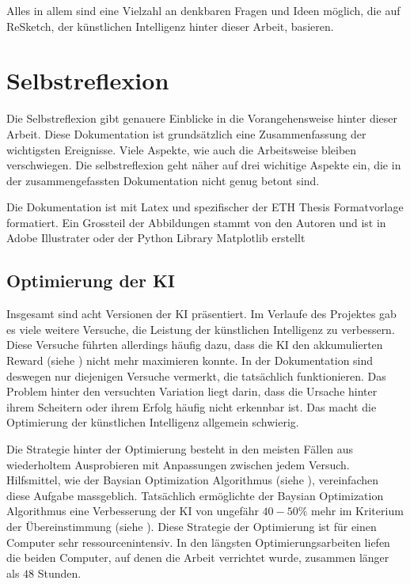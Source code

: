 Alles in allem sind eine Vielzahl an denkbaren Fragen und Ideen möglich, die auf
ReSketch, der künstlichen Intelligenz hinter dieser Arbeit, basieren.


\section{Selbstreflexion}\label{chap:d_reflex} Die Selbstreflexion gibt genauere
Einblicke in die Vorangehensweise hinter dieser Arbeit. Diese Dokumentation ist
grundsätzlich eine Zusammenfassung der wichtigsten Ereignisse. Viele Aspekte,
wie auch die Arbeitsweise bleiben verschwiegen. Die selbstreflexion geht näher
auf drei wichitige Aspekte ein, die in der zusammengefassten Dokumentation nicht
genug betont sind.

Die Dokumentation ist mit Latex und spezifischer der ETH Thesis Formatvorlage
\cite{noauthor_cadmo_2014} formatiert. Ein Grossteil der Abbildungen stammt von den Autoren
und ist in Adobe Illustrater oder der Python Library Matplotlib erstellt

\subsection{Optimierung der KI}\label{sub:d_reflex_opti} Insgesamt sind acht
Versionen der KI präsentiert. Im Verlaufe des Projektes gab es viele weitere
Versuche, die Leistung der künstlichen Intelligenz zu verbessern. Diese Versuche
führten allerdings häufig dazu, dass die KI den akkumulierten Reward (siehe
) nicht mehr maximieren konnte. In der Dokumentation sind
deswegen nur diejenigen Versuche vermerkt, die tatsächlich funktionieren. Das
Problem hinter den versuchten Variation liegt darin, dass die Ursache hinter
ihrem Scheitern oder ihrem Erfolg häufig nicht erkennbar ist. Das macht die
Optimierung der künstlichen Intelligenz allgemein schwierig. 

Die Strategie hinter der Optimierung besteht in den meisten Fällen aus
wiederholtem Ausprobieren mit Anpassungen zwischen jedem Versuch. Hilfsmittel,
wie der Baysian Optimization Algorithmus (siehe ),
vereinfachen diese Aufgabe massgeblich. Tatsächlich ermöglichte der Baysian
Optimization Algorithmus eine Verbesserung der KI von ungefähr $40-50\%$ mehr im
Kriterium der Übereinstimmung (siehe ). Diese Strategie
der Optimierung ist für einen Computer sehr ressourcenintensiv. In den längsten
Optimierungsarbeiten liefen die beiden Computer, auf denen die Arbeit verrichtet
wurde, zusammen länger als $48$ Stunden.

